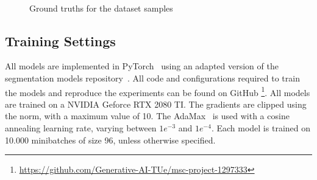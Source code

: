 \begin{figure}
    \centering
    \\
    \caption{\label{fig:coco-samples}Ground truths for the dataset samples}
\end{figure}


\subsection{Training Settings}
All models are implemented in PyTorch~\cite{Ansel_PyTorch_2_Faster_2024} using an adapted version of the segmentation models repository~\cite{Iakubovskii:2019}. All code and configurations required to train the models and reproduce the experiments can be found on GitHub \footnote[1]{\url{https://github.com/Generative-AI-TUe/msc-project-1297333}}. All models are trained on a NVIDIA Geforce RTX 2080 TI. The gradients are clipped using the norm, with a maximum value of 10. The AdaMax~\cite{kingma2017adammethodstochasticoptimization} is used with a cosine annealing learning rate, varying between $1e^{-3}$ and $1e^{-4}$. Each model is trained on 10.000 minibatches of size 96, unless otherwise specified.

